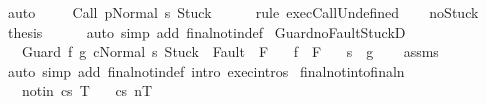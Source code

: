\begin{isabellebody}
\ auto\ \isanewline
\ \ \isamarkupfalse%
\ {\isachardoublequoteopen}{\isasymGamma}{\isasymturnstile}{\isasymlangle}Call\ p{\isacharcomma}Normal\ s{\isasymrangle}\ {\isasymRightarrow}Stuck{\isachardoublequoteclose}\isanewline
\ \ \ \ \isamarkupfalse%
\ {\isacharparenleft}rule\ exec{\isachardot}CallUndefined{\isacharparenright}\isanewline
\ \ \isamarkupfalse%
\ noStuck\ \isamarkupfalse%
\ {\isacharquery}thesis\isanewline
\ \ \ \ \isamarkupfalse%
\ {\isacharparenleft}auto\ simp\ add{\isacharcolon}\ final{\isacharunderscore}notin{\isacharunderscore}def{\isacharparenright}\isanewline
{}\isamarkupfalse%
%
\endisatagproof
{\isafoldproof}%
%
\isadelimproof
\isanewline
%
\endisadelimproof
\isanewline
\isanewline
{}\isamarkupfalse%
\ Guard{\isacharunderscore}noFaultStuckD{\isacharcolon}\ \isanewline
\ \ \ {\isachardoublequoteopen}{\isasymGamma}{\isasymturnstile}{\isasymlangle}Guard\ f\ g\ c{\isacharcomma}Normal\ s{\isasymrangle}\ {\isasymRightarrow}{\isasymnotin}{\isacharparenleft}{\isacharbraceleft}Stuck{\isacharbraceright}\ {\isasymunion}\ Fault\ {\isacharbackquote}\ {\isacharparenleft}{\isacharminus}F{\isacharparenright}{\isacharparenright}{\isachardoublequoteclose}\isanewline
\ \ \ {\isachardoublequoteopen}f\ {\isasymnotin}\ F{\isachardoublequoteclose}\isanewline
\ \ \ {\isachardoublequoteopen}s\ {\isasymin}\ g{\isachardoublequoteclose}\isanewline
%
\isadelimproof
\ \ %
\endisadelimproof
%
\isatagproof
{}\isamarkupfalse%
\ assms\isanewline
\ \ \isamarkupfalse%
\ {\isacharparenleft}auto\ simp\ add{\isacharcolon}\ final{\isacharunderscore}notin{\isacharunderscore}def\ intro{\isacharcolon}\ exec{\isachardot}intros{\isacharparenright}%
\endisatagproof
{\isafoldproof}%
%
\isadelimproof
\isanewline
%
\endisadelimproof
\isanewline
\isanewline
{}\isamarkupfalse%
\ final{\isacharunderscore}notin{\isacharunderscore}to{\isacharunderscore}finaln{\isacharcolon}\ \ \isanewline
\ \ \ notin{\isacharcolon}\ {\isachardoublequoteopen}{\isasymGamma}{\isasymturnstile}{\isasymlangle}c{\isacharcomma}s{\isasymrangle}\ {\isasymRightarrow}{\isasymnotin}T{\isachardoublequoteclose}\isanewline
\ \ \ {\isachardoublequoteopen}{\isasymGamma}{\isasymturnstile}{\isasymlangle}c{\isacharcomma}s{\isasymrangle}\ {\isacharequal}n{\isasymRightarrow}{\isasymnotin}T{\isachardoublequoteclose}\isanewline
%
\isadelimproof
%
\endisadelimproof
%
\isatagproof

\end{isabellebody}
